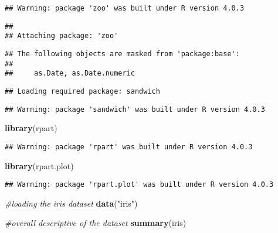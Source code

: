 \documentclass[
]{article}
\newenvironment{Shaded}{\begin{snugshade}}{\end{snugshade}}
\newcommand{\CommentTok}[1]{\textcolor[rgb]{0.56,0.35,0.01}{\textit{#1}}}
\newcommand{\KeywordTok}[1]{\textcolor[rgb]{0.13,0.29,0.53}{\textbf{#1}}}
\newcommand{\NormalTok}[1]{#1}
\newcommand{\StringTok}[1]{\textcolor[rgb]{0.31,0.60,0.02}{#1}}
\begin{document}
\begin{verbatim}
## Warning: package 'zoo' was built under R version 4.0.3
\end{verbatim}

\begin{verbatim}
## 
## Attaching package: 'zoo'
\end{verbatim}

\begin{verbatim}
## The following objects are masked from 'package:base':
## 
##     as.Date, as.Date.numeric
\end{verbatim}

\begin{verbatim}
## Loading required package: sandwich
\end{verbatim}

\begin{verbatim}
## Warning: package 'sandwich' was built under R version 4.0.3
\end{verbatim}

\begin{Shaded}
\begin{Highlighting}[]
\KeywordTok{library}\NormalTok{(rpart)}
\end{Highlighting}
\end{Shaded}

\begin{verbatim}
## Warning: package 'rpart' was built under R version 4.0.3
\end{verbatim}

\begin{Shaded}
\begin{Highlighting}[]
\KeywordTok{library}\NormalTok{(rpart.plot)}
\end{Highlighting}
\end{Shaded}

\begin{verbatim}
## Warning: package 'rpart.plot' was built under R version 4.0.3
\end{verbatim}

\begin{Shaded}
\begin{Highlighting}[]
\CommentTok{#loading the iris dataset}
\KeywordTok{data}\NormalTok{(}\StringTok{"iris"}\NormalTok{)}

\CommentTok{#overall descriptive of the dataset }
\KeywordTok{summary}\NormalTok{(iris)}
\end{Highlighting}
\end{Shaded}
\end{document}
